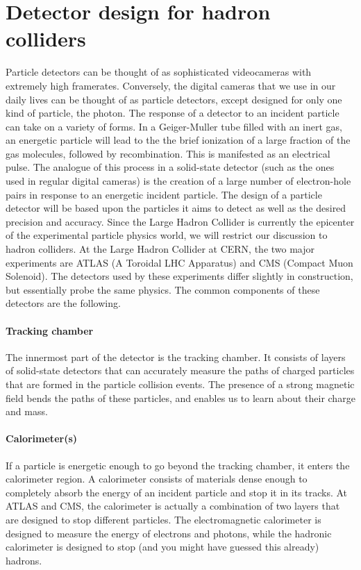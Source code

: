 \section{Detector design for hadron colliders}
Particle detectors can be thought of as sophisticated videocameras with extremely high framerates. Conversely, the digital cameras that we use in our daily lives can be thought of as particle detectors, except designed for only one kind of particle, the photon. The response of a detector to an incident particle can take on a variety of forms. In a Geiger-Muller tube filled with an inert gas, an energetic particle will lead to the the brief ionization of a large fraction of the gas molecules, followed by recombination. This is manifested as an electrical pulse. The analogue of this process in a solid-state detector (such as the ones used in regular digital cameras) is the creation of a large number of electron-hole pairs in response to an energetic incident particle. The design of a particle detector will be based upon the particles it aims to detect as well as the desired precision and accuracy. Since the Large Hadron Collider is currently the epicenter of the experimental particle physics world, we will restrict our discussion to hadron colliders.
At the Large Hadron Collider at CERN, the two major experiments are ATLAS (A Toroidal LHC Apparatus) and CMS (Compact Muon Solenoid). The detectors used by these experiments differ slightly in construction, but essentially probe the same physics. The common components of these detectors are the following. 
\paragraph{Tracking chamber}
The innermost part of the detector is the tracking chamber. It consists of layers of solid-state detectors that can accurately measure the paths of charged particles that are formed in the particle collision events. The presence of a strong magnetic field bends the paths of these particles, and enables us to learn about their charge and mass.
\paragraph{Calorimeter(s)}
If a particle is energetic enough to go beyond the tracking chamber, it enters the calorimeter region. A calorimeter consists of materials dense enough to completely absorb the energy of an incident particle and stop it in its tracks. At ATLAS and CMS, the calorimeter is actually a combination of two layers that are designed to stop different particles. The electromagnetic calorimeter is designed to measure the energy of electrons and photons, while the hadronic calorimeter is designed to stop (and you might have guessed this already) hadrons. 
